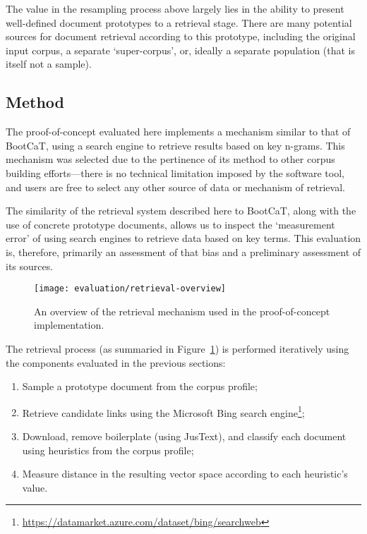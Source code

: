 The value in the resampling process above largely lies in the ability to present well-defined document prototypes to a retrieval stage.  There are many potential sources for document retrieval according to this prototype, including the original input corpus, a separate `super-corpus', or, ideally a separate population (that is itself not a sample).



\subsection{Method}
\label{sec:evaluation:method}

The proof-of-concept evaluated here implements a mechanism similar to that of BootCaT\cite{baroni2004bootcat}, using a search engine to retrieve results based on key n-grams.  This mechanism was selected due to the pertinence of its method to other corpus building efforts---there is no technical limitation imposed by the software tool, and users are free to select any other source of data or mechanism of retrieval.

The similarity of the retrieval system described here to BootCaT, along with the use of concrete prototype documents, allows us to inspect the `measurement error' of using search engines to retrieve data based on key terms.  This evaluation is, therefore, primarily an assessment of that bias and a preliminary assessment of its sources.


\begin{figure}[ht]
    \centering
    \texttt{[image: evaluation/retrieval-overview]}
    \caption{An overview of the retrieval mechanism used in the proof-of-concept implementation.}
\label{fig:evaluation:retrieval:outline}
\end{figure}


The retrieval process (as summaried in Figure~\ref{fig:evaluation:retrieval:outline}) is performed iteratively using the components evaluated in the previous sections:

\begin{enumerate}
    \item Sample a prototype document from the corpus profile;
    \item Retrieve candidate links using the Microsoft Bing search engine\footnote{\url{https://datamarket.azure.com/dataset/bing/searchweb}};
    \item Download, remove boilerplate (using JusText\cite{pomikalek2013justext}), and classify each document using heuristics from the corpus profile;
    \item Measure distance in the resulting vector space according to each heuristic's value.
\end{enumerate}

